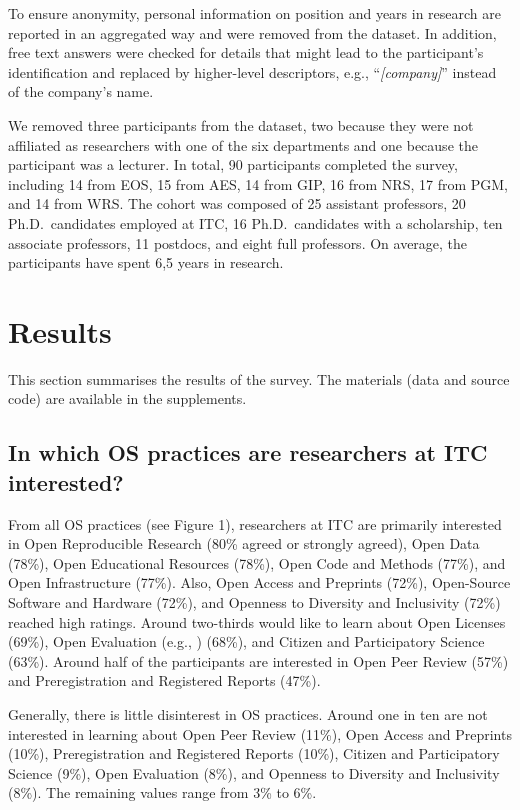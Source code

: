 \documentclass[gc, manuscript]{copernicus}
\begin{document}
To ensure anonymity, personal information on position and years in
research are reported in an aggregated way and were removed from the
dataset. In addition, free text answers were checked for details that
might lead to the participant's identification and replaced by
higher-level descriptors, e.g., ``\textit{[company]}'' instead of the
company's name.

We removed three participants from the dataset, two because they were
not affiliated as researchers with one of the six departments and one
because the participant was a lecturer. In total, 90 participants
completed the survey, including 14 from EOS, 15 from AES, 14 from GIP,
16 from NRS, 17 from PGM, and 14 from WRS. The cohort was composed of 25
assistant professors, 20 Ph.D.~candidates employed at ITC, 16
Ph.D.~candidates with a scholarship, ten associate professors, 11
postdocs, and eight full professors. On average, the participants have
spent 6,5 years in research.

\section{Results}

This section summarises the results of the survey. The materials (data
and source code) are available in the supplements.

\subsection{In which OS practices are researchers at ITC interested?}

From all OS practices (see Figure 1), researchers at ITC are primarily
interested in Open Reproducible Research (80\% agreed or strongly
agreed), Open Data (78\%), Open Educational Resources (78\%), Open Code
and Methods (77\%), and Open Infrastructure (77\%). Also, Open Access
and Preprints (72\%), Open-Source Software and Hardware (72\%), and
Openness to Diversity and Inclusivity (72\%) reached high ratings.
Around two-thirds would like to learn about Open Licenses (69\%), Open
Evaluation (e.g.,
\href{https://sfdora.org/}{\color{blue}{San Francisco Declaration on Research Assessment}})
(68\%), and Citizen and Participatory Science (63\%). Around half of the
participants are interested in Open Peer Review (57\%) and
Preregistration and Registered Reports (47\%).

Generally, there is little disinterest in OS practices. Around one in
ten are not interested in learning about Open Peer Review (11\%), Open
Access and Preprints (10\%), Preregistration and Registered Reports
(10\%), Citizen and Participatory Science (9\%), Open Evaluation (8\%),
and Openness to Diversity and Inclusivity (8\%). The remaining values
range from 3\% to 6\%.
\end{document}
